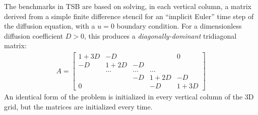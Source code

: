 \documentclass{sig-alternate-05-2015}
\begin{document}
The benchmarks in TSB are based on solving, in each vertical column,
  a matrix derived from a simple finite difference stencil 
  for an ``implicit Euler'' time step of the diffusion equation,
  with a $u=0$ boundary condition.
For a dimensionless diffusion coefficient \(D > 0\), this
  produces a \emph{diagonally-dominant} tridiagonal matrix:
\begin{align*}
A = 
\begin{bmatrix}
1 + 3D & -D &     &          & 0        \\
-D & 1 + 2D & -D &          &          \\
    & ...& ...    & ...     &              \\
    &         & -D & 1 + 2D     & -D \\
0   &     &     & -D & 1 + 3D
\end{bmatrix}  
\end{align*}
An identical form of the problem is initialized in every vertical column of the
  3D grid, but the matrices are initialized every time.


\end{document}
